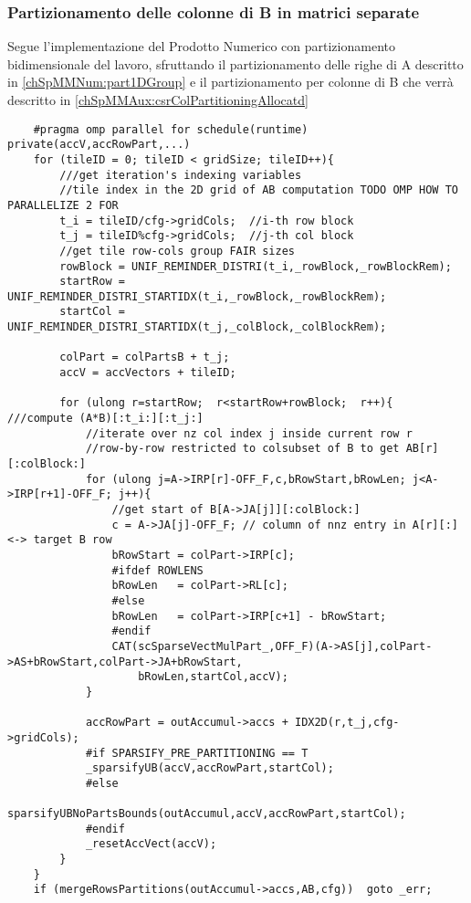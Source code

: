 \subsubsection{Partizionamento delle colonne di B in matrici separate}
Segue l'implementazione del Prodotto Numerico con partizionamento bidimensionale del lavoro,
sfruttando il partizionamento delle righe di A descritto in \ref{chSpMMNum:part1DGroup}
e il partizionamento per colonne di B che verrà descritto in \ref{chSpMMAux:csrColPartitioningAllocatd}
\begin{lstlisting}
    #pragma omp parallel for schedule(runtime) private(accV,accRowPart,...)
    for (tileID = 0; tileID < gridSize; tileID++){
        ///get iteration's indexing variables
        //tile index in the 2D grid of AB computation TODO OMP HOW TO PARALLELIZE 2 FOR
        t_i = tileID/cfg->gridCols;  //i-th row block
        t_j = tileID%cfg->gridCols;  //j-th col block
        //get tile row-cols group FAIR sizes
        rowBlock = UNIF_REMINDER_DISTRI(t_i,_rowBlock,_rowBlockRem); 
        startRow = UNIF_REMINDER_DISTRI_STARTIDX(t_i,_rowBlock,_rowBlockRem);
        startCol = UNIF_REMINDER_DISTRI_STARTIDX(t_j,_colBlock,_colBlockRem);
        
        colPart = colPartsB + t_j;
        accV = accVectors + tileID; 
         
        for (ulong r=startRow;  r<startRow+rowBlock;  r++){		///compute (A*B)[:t_i:][:t_j:]
            //iterate over nz col index j inside current row r
            //row-by-row restricted to colsubset of B to get AB[r][:colBlock:]
            for (ulong j=A->IRP[r]-OFF_F,c,bRowStart,bRowLen; j<A->IRP[r+1]-OFF_F; j++){
                //get start of B[A->JA[j]][:colBlock:]
                c = A->JA[j]-OFF_F; // column of nnz entry in A[r][:] <-> target B row
                bRowStart = colPart->IRP[c];
				#ifdef ROWLENS
                bRowLen   = colPart->RL[c];
				#else
                bRowLen   = colPart->IRP[c+1] - bRowStart;
				#endif
                CAT(scSparseVectMulPart_,OFF_F)(A->AS[j],colPart->AS+bRowStart,colPart->JA+bRowStart,
                    bRowLen,startCol,accV);
            }

            accRowPart = outAccumul->accs + IDX2D(r,t_j,cfg->gridCols);
			#if SPARSIFY_PRE_PARTITIONING == T
			_sparsifyUB(accV,accRowPart,startCol);
			#else
            sparsifyUBNoPartsBounds(outAccumul,accV,accRowPart,startCol);
			#endif
            _resetAccVect(accV);
        }
    }
    if (mergeRowsPartitions(outAccumul->accs,AB,cfg))  goto _err;
\end{lstlisting}
